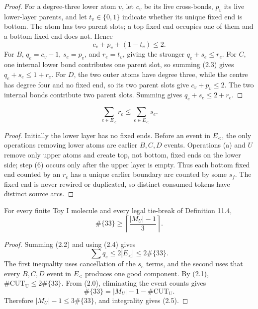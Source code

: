\documentclass[12pt]{article}
\newcommand{\good}{\#\{33\}}
\newcommand{\MU}{M_U}
\begin{document}
\begin{proof}
For a degree-three lower atom \(v\), let \(c_v\) be its live cross-bonds,
\(p_v\) its live lower-layer parents, and let \(t_v\in\{0,1\}\) indicate
whether its unique fixed end is bottom.  The atom has two parent slots; a top
fixed end occupies one of them and a bottom fixed end does not.  Hence
\begin{equation}
 c_v+p_v+(1-t_v)\le2. \tag{2.3}
\end{equation}
For \(B\), \(q_e=c_v-1\), \(s_e=p_v\), and \(r_e=t_v\), giving the stronger
\(q_e+s_e\le r_e\).  For \(C\), one internal lower bond contributes one
parent slot, so summing (2.3) gives \(q_e+s_e\le1+r_e\).  For \(D\), the two
outer atoms have degree three, while the centre has degree four and no fixed
end, so its two parent slots give \(c_v+p_v\le2\).  The two internal bonds
contribute two parent slots.  Summing gives
\(q_e+s_e\le2+r_e\).\end{proof}

\begin{lemma}
\begin{equation}
 \sum_{e\in E_<}r_e\le\sum_{e\in E_<}s_e. \tag{2.4}
\end{equation}
\end{lemma}

\begin{proof}
Initially the lower layer has no fixed ends.  Before an event in \(E_<\), the
only operations removing lower atoms are earlier \(B,C,D\) events.  Operations
(a) and \(U\) remove only upper atoms and create top, not bottom, fixed ends on
the lower side; step (6) occurs only after the upper layer is empty.  Thus each
bottom fixed end counted by an \(r_e\) has a unique earlier boundary arc counted
by some \(s_f\).  The fixed end is never rewired or duplicated, so distinct
consumed tokens have distinct source arcs.\end{proof}

\begin{theorem}
For every finite Toy I molecule and every legal tie-break of Definition 11.4,
\begin{equation}
 \good\ge\left\lceil\frac{|\MU|-1}{3}\right\rceil. \tag{2.5}
\end{equation}
\end{theorem}

\begin{proof}
Summing (2.2) and using (2.4) gives
\[
 \sum q_e\le2|E_<|\le2\good.
\]
The first inequality uses cancellation of the \(s_e\) terms, and the second
uses that every \(B,C,D\) event in \(E_<\) produces one good component.  By
(2.1), \(\#\mathrm{CUT_U}\le2\good\).  From (2.0), eliminating the event
counts gives
\[
 \good=|\MU|-1-\#\mathrm{CUT_U}.
\]
Therefore \(|\MU|-1\le3\good\), and integrality gives (2.5).\end{proof}
\end{document}
